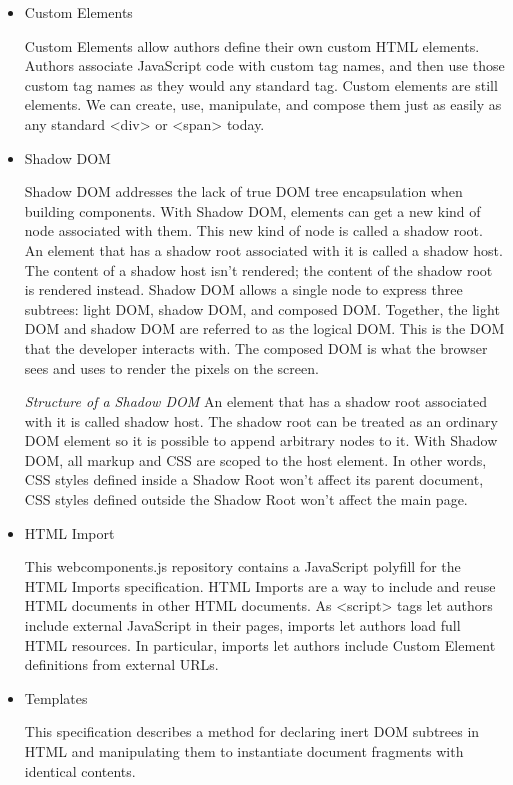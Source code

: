 \begin{itemize}

\item Custom Elements 

Custom Elements allow authors define their own custom HTML elements. Authors associate JavaScript code with custom tag names, and then use those custom tag names as they would any standard tag. Custom elements are still elements. We can create, use, manipulate, and compose them just as easily as any standard <div> or <span> today.\cite{tch_custom}

\item Shadow DOM

Shadow DOM addresses the lack of true DOM tree encapsulation when building components. With Shadow DOM, elements can get a new kind of node associated with them. This new kind of node is called a shadow root. An element that has a shadow root associated with it is called a shadow host. The content of a shadow host isn’t rendered; the content of the shadow root is rendered instead. Shadow DOM allows a single node to express three subtrees: light DOM, shadow DOM, and composed DOM. Together, the light DOM and shadow DOM are referred to as the logical DOM. This is the DOM that the developer interacts with. The composed DOM is what the browser sees and uses to render the pixels on the screen.\cite{tch_dom}

\emph{Structure of a Shadow DOM}
An element that has a shadow root associated with it is called shadow host. The shadow root can be treated as an ordinary DOM element so it is possible to append arbitrary nodes to it. With Shadow DOM, all markup and CSS are scoped to the host element. In other words, CSS styles defined inside a Shadow Root won't affect its parent document, CSS styles defined outside the Shadow Root won't affect the main page.

\item HTML Import 

This webcomponents.js repository contains a JavaScript polyfill for the HTML Imports specification.
HTML Imports are a way to include and reuse HTML documents in other HTML documents. As <script> tags let authors include external JavaScript in their pages, imports let authors load full HTML resources. In particular, imports let authors include Custom Element definitions from external URLs.

\item Templates

This specification describes a method for declaring inert DOM subtrees in HTML and manipulating them to instantiate document fragments with identical contents.
\end{itemize}

